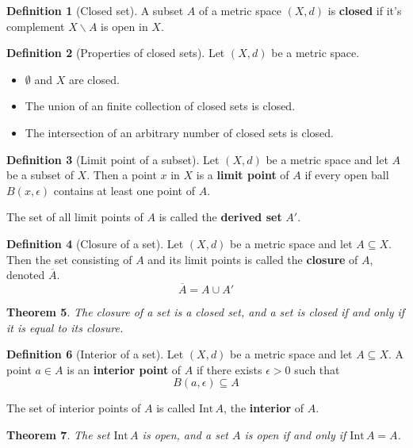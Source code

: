 \documentclass[10pt, oneside, reqno]{amsart}
\theoremstyle{plain}%
\newtheorem{thm}{Theorem}[section]
\theoremstyle{definition}
\newtheorem{defn}[thm]{Definition}
\theoremstyle{remark}
\newcommand{\met}{(X,d)}
\newcommand{\intr}{\text{Int}\,}
\newcommand{\ol}[1]{\overline{#1}}
\begin{document}
\begin{defn}[Closed set]
	A subset $A$ of a metric space $\met$ is \textbf{closed} if it's complement $X \backslash A$ is open in $X$.
\end{defn}

\begin{defn}[Properties of closed sets]
	Let $\met$ be a metric space.
	\begin{itemize}
		\item $\emptyset$ and $X$ are closed.
		\item The union of an finite collection of closed sets is closed.
		\item The intersection of an arbitrary number of closed sets is closed.
	\end{itemize}
\end{defn}

\begin{defn}[Limit point of a subset]
	Let $\met$ be a metric space and let $A$ be a subset of $X$.  Then a point $x$ in $X$ is a \textbf{limit point} of $A$ if every open ball $B(x, \epsilon)$ contains at least one point of $A$.
	
	The set of all limit points of $A$ is called the \textbf{derived set} $A'$.
\end{defn}

\begin{defn}[Closure of a set]
	Let $\met$ be a metric space and let $A \subseteq X$.  Then the set consisting of $A$ and its limit points is called the \textbf{closure} of $A$, denoted $\ol{A}$.  \[
		\ol{A} = A \cup A'
	\]
\end{defn}

\begin{thm}
	The closure of a set is a closed set, and a set is closed if and only if it is equal to its closure.
\end{thm}

\begin{defn}[Interior of a set]
	Let $\met$ be a metric space and let $A \subseteq X$.  A point $a \in A$ is an \textbf{interior point} of $A$ if there exists $\epsilon > 0$ such that \[
		B(a, \epsilon) \subseteq A
	\]
	
	The set of interior points of $A$ is called $\intr A$, the \textbf{interior} of $A$.
\end{defn}

\begin{thm}
	The set $\intr A$ is open, and a set $A$ is open if and only if $\intr A = A$.
\end{thm}
\end{document}
